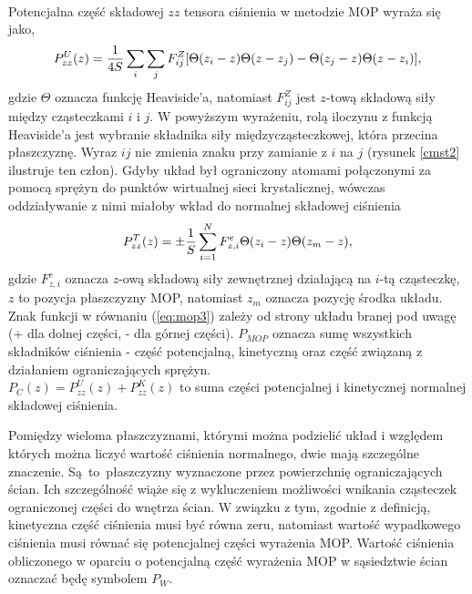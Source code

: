 \documentclass[12pt,a4paper,openright]{report} %
\begin{document}
%
\\
Potencjalna część składowej $zz$ tensora ciśnienia w metodzie MOP wyraża się jako,
%
\begin{equation}
P_{zz}^{U}(z)= {1\over{4S}} \sum_{i} \sum_{j} F^{Z}_{ij} [ \Theta(z_{i}-z)\Theta(z-z_{j}) - \Theta(z_{j}-z)\Theta(z-z_{i})],
\label{eq:mop2}
\end{equation}
%
gdzie $\Theta$ oznacza funkcję Heaviside'a, natomiast $F^{Z}_{ij}$ jest $z$-tową składową siły między cząsteczkami $i$ i $j$. 
W powyższym wyrażeniu, rolą iloczynu z funkcją Heaviside'a jest wybranie
składnika siły międzycząsteczkowej, która przecina płaszczyznę. Wyraz $ij$ nie zmienia znaku przy zamianie z $i$ na $j$ (rysunek \ref{cmst2} ilustruje ten człon).
Gdyby układ był ograniczony atomami połączonymi za pomocą sprężyn do punktów wirtualnej sieci krystalicznej, wówczas oddziaływanie z nimi miałoby wkład do normalnej składowej ciśnienia
%
\begin{equation}
P_{zz}^{T}(z)=\pm {1 \over{S}} \sum_{i=1}^{N}
F^{e}_{z,i}\Theta(z_i-z)\Theta(z_m-z),
\label{eq:mop3}
\end{equation}
gdzie  $F^{e}_{z,i}$  oznacza $z$-ową składową siły zewnętrznej działającą na $i$-tą
cząsteczkę, $z$ to pozycja płaszczyzny MOP, natomiast $z_m$ oznacza pozycję środka
układu. Znak funkcji w równaniu (\ref{eq:mop3}) zależy od strony układu 
branej pod uwagę (+ dla dolnej części, - dla górnej części).
$P_{MOP}$ oznacza sumę wszystkich składników ciśnienia - część potencjalną,
kinetyczną oraz część związaną z działaniem ograniczających sprężyn. \\$P_{C}(z)=P_{zz}^{U}(z)+P_{zz}^{K}(z)$ to suma części potencjalnej i kinetycznej normalnej składowej ciśnienia.

Pomiędzy wieloma płaszczyznami, którymi można podzielić układ i względem których można liczyć wartość ciśnienia normalnego, dwie mają szczególne znaczenie. Są~to~płaszczyzny wyznaczone przez powierzchnię ograniczających ścian. Ich szczególność wiąże się z wykluczeniem możliwości wnikania cząsteczek ograniczonej części do wnętrza ścian. W związku z tym, zgodnie z definicją, kinetyczna część ciśnienia musi być równa zeru, natomiast wartość wypadkowego ciśnienia musi równać się potencjalnej części wyrażenia MOP. Wartość ciśnienia obliczonego w oparciu o potencjalną część wyrażenia MOP w sąsiedztwie ścian oznaczać będę symbolem $P_W$.  
\end{document}
